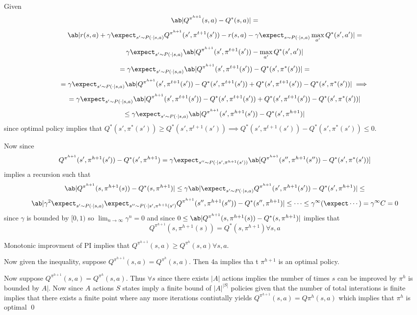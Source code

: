\documentclass[12pt]{amsart}
\begin{document}
  \begin{problem}
    \begin{subproblem}
      Given 
      \[\ab|Q^{\pi^{h+1}}(s,a)-Q^*(s,a)| =\]
      \[\ab|r(s,a) + \gamma\expect_{s'\sim P(\cdot |s,a)}Q^{\pi^{h+1}}(s',\pi^{t+1}(s')) - r(s,a) - \gamma\expect_{s\sim P(\cdot | s,a)}\max_{a'}Q^*(s',a')| = \]
      \[\gamma\expect_{s'\sim P(\cdot |s,a)}\ab|Q^{\pi^{h+1}}(s',\pi^{t+1}(s'))-\max_{a'}Q^*(s',a')|\]
      \[ = \gamma\expect_{s'\sim P(\cdot |s,a)}\ab|Q^{\pi^{h+1}}(s',\pi^{t+1}(s'))-Q^*(s',\pi^*(s'))|= \]
      \[ = \gamma\expect_{s'\sim P(\cdot |s,a)}\ab|Q^{\pi^{h+1}}(s',\pi^{t+1}(s')) -Q^*(s',\pi^{t+1}(s'))+Q^*(s',\pi^{t+1}(s'))-Q^*(s',\pi^*(s'))|\implies \]
      \[ = \gamma\expect_{s'\sim P(\cdot |s,a)}\ab|Q^{\pi^{h+1}}(s',\pi^{t+1}(s')) -Q^*(s',\pi^{t+1}(s'))+Q^*(s',\pi^{t+1}(s'))-Q^*(s',\pi^*(s'))|\]
      \[\leq\gamma\expect_{s'\sim P(\cdot |s,a)}\ab|Q^{\pi^{h+1}}(s',\pi^{h+1}(s')) - Q^*(s',\pi^{h+1})|\]
      since optimal policy implies that $Q^*(s',\pi^*(s'))\geq Q^*(s',\pi^{t+1}(s')) \implies Q^*(s',\pi^{t+1}(s'))- Q^*(s',\pi^*(s')) \leq 0$.
      
      Now since 
      \[Q^{\pi^{h+1}}(s',\pi^{h+1}(s')) - Q^*(s',\pi^{h+1}) = \gamma\expect_{s''\sim P(\cdot |s', \pi^{h+1}(s'))}\ab[Q^{\pi^{h+1}}(s'', \pi^{h+1}(s''))-Q^*(s', \pi^*(s'))]\]
      implies a recursion such that
      \[\ab|Q^{\pi^{h+1}}(s,\pi^{h+1}(s)) - Q^*(s,\pi^{h+1})| \leq \gamma \ab|\expect_{s'\sim P(\cdot|s,a)}Q^{\pi^{h+1}}(s',\pi^{h+1}(s')) - Q^*(s',\pi^{h+1})| \leq \]
        \[\ab|\gamma^2\expect_{s'\sim P(\cdot|s,a)}\expect_{s''\sim P(\cdot|s',\pi^{h+1}(s')} 
Q^{\pi^{h+1}}(s'',\pi^{h+1}(s'')) - Q^*(s'',\pi^{h+1})|\leq \cdots \leq \gamma^\infty (\expect\cdots)= \gamma^\infty C = 0 \]
      since $\gamma$ is bounded by $[0,1)$ so $\lim_{n\to\infty}\gamma^n = 0$ and since $0\leq \ab|Q^{\pi^{h+1}}(s,\pi^{h+1}(s)) - Q^*(s,\pi^{h+1})|$ implies that   
      \[Q^{\pi^{h+1}}(s,\pi^{h+1}(s)) = Q^*(s,\pi^{h+1})\forall s,a\]
    \end{subproblem} 
    \begin{subproblem}
      Monotonic improvment of PI implies that $Q^{\pi^{h+1}}(s,a)\geq Q^{\pi^h}(s,a)\forall s,a$. 

      Now given the inequality, suppose $Q^{\pi^{h+1}}(s,a) = Q^{\pi^h}(s,a)$. Then 4a implies tha t $\pi^{h+1}$ is an optimal policy. 

      Now suppose $Q^{\pi^{h+1}}(s,a) = Q^{\pi^h}(s,a)$. Thus $\forall s$ since there exists $|A|$ actions implies the number of times $s$ can be improved by $\pi^h$ is bounded by $A|$. Now since $A$ actions $S$ states imply a finite bound of $|A|^|S|$ policies given that the number of total interations is finite implies that there exists a finite point where any more iterations contiutally yields $Q^{\pi^{h+1}}(s,a)=Q\pi^h(s,a)$ which implies that $\pi^h$ is optimal \qed 
    \end{subproblem}
  \end{problem}
  
\end{document}
